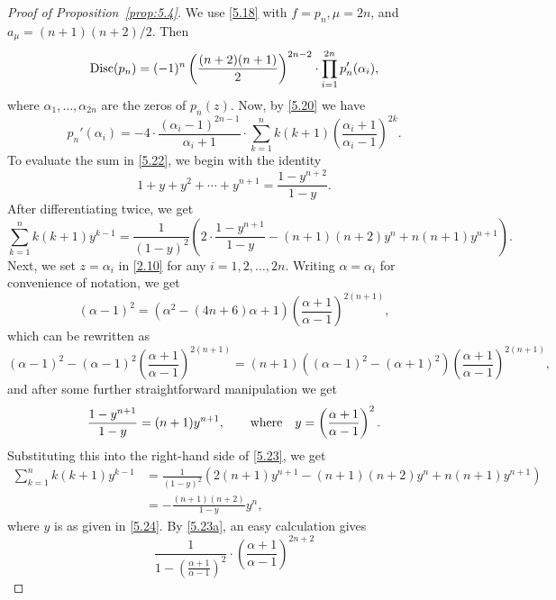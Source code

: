 \documentclass{amsart}
\theoremstyle{plain}
\numberwithin{equation}{section}
\begin{document}
\begin{proof}[Proof of Proposition~\ref{prop:5.4}]
We use \eqref{5.18} with $f=p_n, \mu=2n$, and $a_{\mu}=(n+1)(n+2)/2$. Then
\begin{equation}\label{5.21}
{\rm Disc}(p_n)=(-1)^n \left(\frac{(n+2)(n+1)}{2}\right)^{2n-2}
\cdot\prod_{i=1}^{2n}p_n'(\alpha_i),
\end{equation}
where $\alpha_1, \ldots, \alpha_{2n}$ are the zeros of $p_n(z)$. Now, by
\eqref{5.20} we have
\begin{equation}\label{5.22}
p_n'(\alpha_i) =-4\cdot \frac{(\alpha_i-1)^{2n-1}}{\alpha_i+1}\cdot 
\sum_{k=1}^n k(k+1)\left(\frac{\alpha_i+1}{\alpha_i-1}\right)^{2k}.
\end{equation}
To evaluate the sum in \eqref{5.22}, we begin with the identity
\[
1+y+y^2+\cdots+y^{n+1} = \frac{1-y^{n+2}}{1-y}.
\]
After differentiating twice, we get
\begin{equation}\label{5.23}
\sum_{k=1}^n k(k+1)y^{k-1} = \frac{1}{(1-y)^2}\left(2\cdot\frac{1-y^{n+1}}{1-y}
-(n+1)(n+2)y^n+n(n+1)y^{n+1}\right).
\end{equation}
Next, we set $z=\alpha_i$ in \eqref{2.10} for any $i=1,2, \ldots, 2n$. 
Writing $\alpha=\alpha_i$ for convenience of notation, we get
\begin{equation}\label{5.23a}
(\alpha-1)^2
=(\alpha^2-(4n+6)\alpha+1)\left(\frac{\alpha+1}{\alpha-1}\right)^{2(n+1)},
\end{equation}
which can be rewritten as
\[
(\alpha-1)^2-(\alpha-1)^2\left(\frac{\alpha+1}{\alpha-1}\right)^{2(n+1)}
=(n+1)\left((\alpha-1)^2-(\alpha+1)^2\right)
\left(\frac{\alpha+1}{\alpha-1}\right)^{2(n+1)},
\]
and after some further straightforward manipulation we get
\begin{equation}\label{5.24}
\frac{1-y^{n+1}}{1-y}=(n+1)y^{n+1},\qquad\hbox{where}\quad
y= \left(\frac{\alpha+1}{\alpha-1}\right)^2.
\end{equation}
Substituting this into the right-hand side of \eqref{5.23}, we get
\begin{align}
\sum_{k=1}^n k(k+1)y^{k-1} &= \frac{1}{(1-y)^2}\left(2(n+1)y^{n+1}
-(n+1)(n+2)y^n+n(n+1)y^{n+1}\right) \label{5.25}\\
&=-\frac{(n+1)(n+2)}{1-y}y^{n},\nonumber
\end{align}
where $y$ is as given in \eqref{5.24}. By \eqref{5.23a}, an easy calculation 
gives
\begin{equation}\label{5.26}
\frac{1}{1-\left(\frac{\alpha+1}{\alpha-1}\right)^2}\cdot
\left(\frac{\alpha+1}{\alpha-1}\right)^{2n+2}

\end{equation}
\end{proof}
\end{document}
